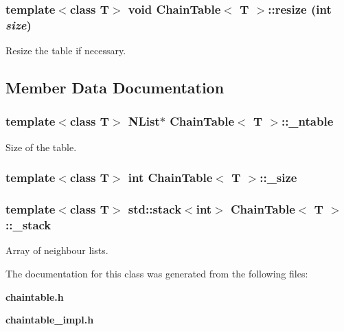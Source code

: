 \subsubsection{\setlength{\rightskip}{0pt plus 5cm}template$<$class T$>$ void {\bf Chain\-Table}$<$ T $>$::resize (int {\em size})}\label{classChainTable_a3}


Resize the table if necessary. 



\subsection{Member Data Documentation}
\subsubsection{\setlength{\rightskip}{0pt plus 5cm}template$<$class T$>$ {\bf NList}$\ast$ {\bf Chain\-Table}$<$ T $>$::{\bf \_\-ntable}\hspace{0.3cm}{\tt  [protected]}}\label{classChainTable_p1}


Size of the table. 

\subsubsection{\setlength{\rightskip}{0pt plus 5cm}template$<$class T$>$ int {\bf Chain\-Table}$<$ T $>$::{\bf \_\-size}\hspace{0.3cm}{\tt  [protected]}}\label{classChainTable_p0}


\subsubsection{\setlength{\rightskip}{0pt plus 5cm}template$<$class T$>$ std::stack$<$int$>$ {\bf Chain\-Table}$<$ T $>$::{\bf \_\-stack}\hspace{0.3cm}{\tt  [protected]}}\label{classChainTable_p2}


Array of neighbour lists. 



The documentation for this class was generated from the following files:\begin{CompactItemize}
\item 
{\bf chaintable.h}\item 
{\bf chaintable\_\-impl.h}\end{CompactItemize}
